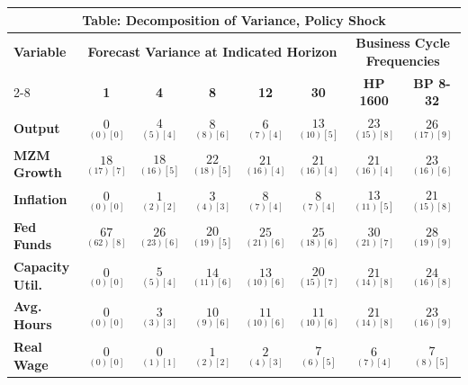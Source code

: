 \documentclass{article}
\begin{document}
 \begin{tabular}{|l|c|@{}c|c|@{}c|c|@{}c|c|} 
 \hline 
 \multicolumn{8}{|c|}{\textbf{Table: Decomposition of Variance, Policy Shock}} \\ \hline 
 \textbf{Variable} & \multicolumn{5}{|c}{\textbf{Forecast Variance at 
 Indicated Horizon}} & \multicolumn{2}{|c|}{\textbf{Business Cycle 
 Frequencies}} \\ \cline{2-8} 
 & \textbf{1} & \textbf{4} & \textbf{8} & \textbf{12} & \textbf{30} & \textbf{%
 HP 1600} & \textbf{BP 8-32} \\ \hline\hline 
 \textbf{Output} & $\underset{(  0) [  0]}{  0}$ & $\underset{(  5) [  4]}{  4}$ & $\underset{(  8) [  6]}{  8}$ & $\underset{(  7) [  4]}{  6}$ & $\underset{( 10) [  5]}{ 13}$ & $\underset{( 15) [  8]}{ 23}$ & $\underset{( 17) [  9]}{ 26}$ \\ \hline 
 \textbf{MZM Growth} & $\underset{( 17) [  7]}{ 18}$ & $\underset{( 16) [  5]}{ 18}$ & $\underset{( 18) [  5]}{ 22}$ & $\underset{( 16) [  4]}{ 21}$ & $\underset{( 16) [  4]}{ 21}$ & $\underset{( 16) [  4]}{ 21}$ & $\underset{( 16) [  6]}{ 23}$ \\ \hline 
 \textbf{Inflation} & $\underset{(  0) [  0]}{  0}$ & $\underset{(  2) [  2]}{  1}$ & $\underset{(  4) [  3]}{  3}$ & $\underset{(  7) [  4]}{  8}$ & $\underset{(  7) [  4]}{  8}$ & $\underset{( 11) [  5]}{ 13}$ & $\underset{( 15) [  8]}{ 21}$ \\ \hline 
 \textbf{Fed Funds} & $\underset{( 62) [  8]}{ 67}$ & $\underset{( 23) [  6]}{ 26}$ & $\underset{( 19) [  5]}{ 20}$ & $\underset{( 21) [  6]}{ 25}$ & $\underset{( 18) [  6]}{ 25}$ & $\underset{( 21) [  7]}{ 30}$ & $\underset{( 19) [  9]}{ 28}$ \\ \hline 
 \textbf{Capacity Util.} & $\underset{(  0) [  0]}{  0}$ & $\underset{(  5) [  4]}{  5}$ & $\underset{( 11) [  6]}{ 14}$ & $\underset{( 10) [  6]}{ 13}$ & $\underset{( 15) [  7]}{ 20}$ & $\underset{( 14) [  8]}{ 21}$ & $\underset{( 16) [  8]}{ 24}$ \\ \hline 
 \textbf{Avg. Hours} & $\underset{(  0) [  0]}{  0}$ & $\underset{(  3) [  3]}{  3}$ & $\underset{(  9) [  6]}{ 10}$ & $\underset{( 10) [  6]}{ 11}$ & $\underset{( 10) [  6]}{ 11}$ & $\underset{( 14) [  8]}{ 21}$ & $\underset{( 16) [  9]}{ 23}$ \\ \hline 
 \textbf{Real Wage} &  $\underset{(  0) [  0]}{  0}$ & $\underset{(  1) [  1]}{  0}$ & $\underset{(  2) [  2]}{  1}$ & $\underset{(  4) [  3]}{  2}$ & $\underset{(  6) [  5]}{  7}$ & $\underset{(  7) [  4]}{  6}$ & $\underset{(  8) [  5]}{  7}$ \\ \hline 

\end{tabular}
\end{document}
